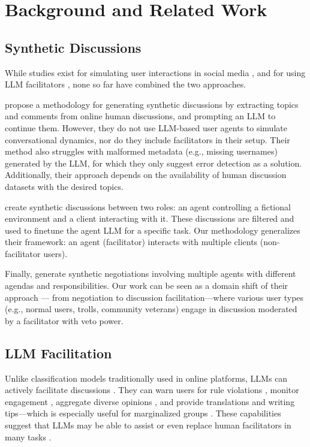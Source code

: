 %
\section{Background and Related Work}

\subsection{Synthetic Discussions}
\label{ssec:related:discussions}

While studies exist for simulating user interactions in social media \cite{park_simulacra, mou_2024, tornberg_2023, y_social, balog_2024}, and for using LLM facilitators \cite{kim_et_al_chatbot, cho-etal-2024-language}, none so far have combined the two approaches. 

\citet{balog_2024} propose a methodology for generating synthetic discussions by extracting topics and comments from online human discussions, and prompting an LLM to continue them. However, they do not use LLM-based user agents to simulate conversational dynamics, nor do they include facilitators in their setup. Their method also struggles with malformed metadata (e.g., missing usernames) generated by the LLM, for which they only suggest error detection as a solution. Additionally, their approach depends on the availability of human discussion datasets with the desired topics.

\citet{ulmer2024} create synthetic discussions between two roles: an agent controlling a fictional environment and a client interacting with it. These discussions are filtered and used to finetune the agent LLM for a specific task. Our methodology generalizes their framework: an agent (facilitator) interacts with multiple clients (non-facilitator users).

Finally, \citet{abdelnabi_negotiations} generate synthetic negotiations involving multiple agents with different agendas and responsibilities. Our work can be seen as a domain shift of their approach --- from negotiation to discussion facilitation---where various user types (e.g., normal users, trolls, community veterans) engage in discussion moderated by a facilitator with veto power.


\subsection{LLM Facilitation}

Unlike classification models traditionally used in online platforms, LLMs can actively facilitate discussions \cite{korre2025evaluation}. They can warn users for rule violations \cite{Kumar_AbuHashem_Durumeric_2024}, monitor engagement \cite{schroeder-etal-2024-fora}, aggregate diverse opinions \cite{small-polis-llm}, and provide translations and writing tips---which is especially useful for marginalized groups \cite{Tsai2024Generative}. These capabilities suggest that LLMs may be able to assist or even replace human facilitators in many tasks \cite{small-polis-llm, seering_self_moderation}.

